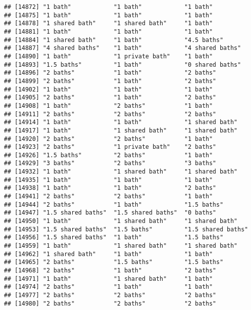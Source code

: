 \documentclass[
]{article}
\begin{document}
\begin{verbatim}
## [14872] "1 bath"            "1 bath"            "1 bath"           
## [14875] "1 bath"            "1 bath"            "1 bath"           
## [14878] "1 shared bath"     "1 shared bath"     "1 bath"           
## [14881] "1 bath"            "1 bath"            "1 bath"           
## [14884] "1 shared bath"     "1 bath"            "4.5 baths"        
## [14887] "4 shared baths"    "1 bath"            "4 shared baths"   
## [14890] "1 bath"            "1 private bath"    "1 bath"           
## [14893] "1.5 baths"         "1 bath"            "0 shared baths"   
## [14896] "2 baths"           "1 bath"            "2 baths"          
## [14899] "2 baths"           "1 bath"            "2 baths"          
## [14902] "1 bath"            "1 bath"            "1 bath"           
## [14905] "2 baths"           "1 bath"            "2 baths"          
## [14908] "1 bath"            "2 baths"           "1 bath"           
## [14911] "2 baths"           "2 baths"           "2 baths"          
## [14914] "1 bath"            "1 bath"            "1 shared bath"    
## [14917] "1 bath"            "1 shared bath"     "1 shared bath"    
## [14920] "2 baths"           "2 baths"           "1 bath"           
## [14923] "2 baths"           "1 private bath"    "2 baths"          
## [14926] "1.5 baths"         "2 baths"           "1 bath"           
## [14929] "3 baths"           "2 baths"           "3 baths"          
## [14932] "1 bath"            "1 shared bath"     "1 shared bath"    
## [14935] "1 bath"            "1 bath"            "1 bath"           
## [14938] "1 bath"            "1 bath"            "2 baths"          
## [14941] "2 baths"           "2 baths"           "1 bath"           
## [14944] "2 baths"           "1 bath"            "1.5 baths"        
## [14947] "1.5 shared baths"  "1.5 shared baths"  "0 baths"          
## [14950] "1 bath"            "1 shared bath"     "1 shared bath"    
## [14953] "1.5 shared baths"  "1.5 baths"         "1.5 shared baths" 
## [14956] "1.5 shared baths"  "1 bath"            "1.5 baths"        
## [14959] "1 bath"            "1 shared bath"     "1 shared bath"    
## [14962] "1 shared bath"     "1 bath"            "1 bath"           
## [14965] "2 baths"           "1.5 baths"         "1.5 baths"        
## [14968] "2 baths"           "1 bath"            "2 baths"          
## [14971] "1 bath"            "1 shared bath"     "1 bath"           
## [14974] "2 baths"           "1 bath"            "1 bath"           
## [14977] "2 baths"           "2 baths"           "2 baths"          
## [14980] "2 baths"           "2 baths"           "2 baths"          

\end{verbatim}
\end{document}
